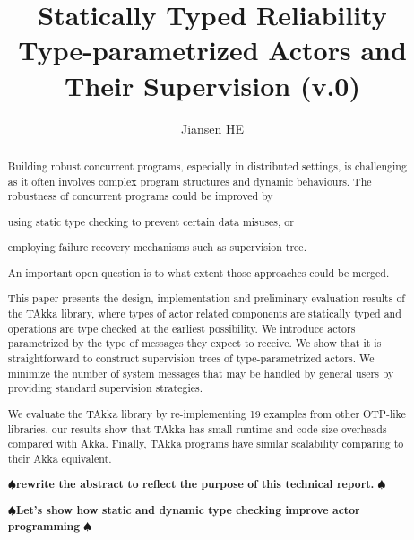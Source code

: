 \documentclass[coverpage]{inftechrep}
\newcommand{\mycomment}[1]{\(\spadesuit\){\bf #1 }\(\spadesuit\)}
\begin{document}
\title{Statically Typed Reliability \\Type-parametrized Actors and Their
Supervision (v.0)
}
\author{Jiansen HE}
\maketitle

\begin{abstract}
Building robust concurrent programs, especially in distributed settings, is
challenging as it often involves complex program structures and dynamic
behaviours.  The robustness of concurrent programs could be improved by
\begin{inparaenum}[(i)]
 \item using static type checking to prevent certain data misuses, or
 \item employing failure recovery mechanisms such as supervision tree.
\end{inparaenum}
An important open question is to what extent those approaches could be merged.

This paper presents the design, implementation and preliminary evaluation
results of the TAkka library, where types of actor related components are
statically typed and operations are type checked at the earliest possibility.
We introduce actors parametrized by the type of messages they expect to
receive. We show that it is straightforward to construct
supervision trees of type-parametrized actors. We minimize the number of system
messages that may be handled by general users by providing standard supervision
strategies.

We evaluate the TAkka library by re-implementing 19 examples from other
OTP-like libraries.  our results show that TAkka has small runtime and
code size overheads compared with Akka. Finally, TAkka programs have similar
scalability comparing
to their Akka equivalent.

\mycomment{rewrite the abstract to reflect the purpose of this technical report.}

\mycomment{Let's show how static and dynamic type checking improve actor
programming}

\end{abstract}






\end{document}
